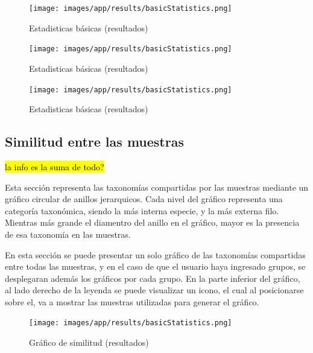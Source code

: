 \begin{figure}[H]
    \texttt{[image: images/app/results/basicStatistics.png]}

    \caption{Estadisticas básicas (resultados)}
    \label{fig:app-results-taxonomicAssig-sample-perc}
\end{figure}

\begin{figure}[H]
    \texttt{[image: images/app/results/basicStatistics.png]}

    \caption{Estadisticas básicas (resultados)}
    \label{fig:app-results-taxonomicAssig-group-nreads}
\end{figure}

\begin{figure}[H]
    \texttt{[image: images/app/results/basicStatistics.png]}

    \caption{Estadisticas básicas (resultados)}
    \label{fig:app-results-taxonomicAssig-group-perc}
\end{figure}
\subsection{Similitud entre las muestras}
\hl{la info es la suma de todo?}


Esta sección representa las taxonomías compartidas por las muestras mediante un gráfico circular de anillos jerarquicos. 
Cada nivel del gráfico representa una categoría taxonómica, siendo la más interna especie, y la más externa filo.
Mientras más grande el diamentro del anillo en el gráfico, mayor es la presencia de esa taxonomía en las muestras.

En esta sección se puede presentar un solo gráfico de las taxonomías compartidas entre todas las muestras, y en el caso de que el usuario haya ingresado grupos, se desplegaran además los gráficos por cada grupo.
En la parte inferior del gráfico, al lado derecho de la leyenda se puede visualizar un icono, el cual al posicionarse sobre el, va a mostrar las muestras utilizadas para generar el gráfico.

\begin{figure}[H]
    \texttt{[image: images/app/results/basicStatistics.png]}

    \caption{Gráfico de similitud  (resultados)}
    \label{fig:app-results-core}
\end{figure}


